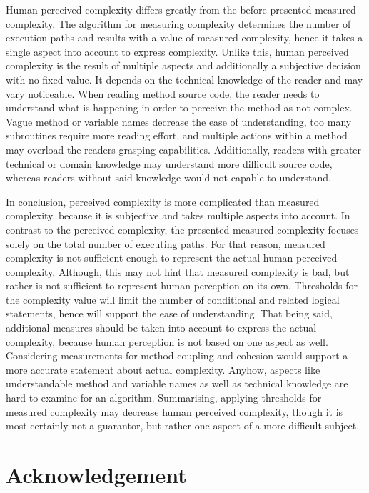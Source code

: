 \documentclass[conference]{IEEEtran}
\begin{document}
Human perceived complexity differs greatly from the before presented measured complexity. The algorithm for measuring complexity determines the number of execution paths and results with a value of measured complexity, hence it takes a single aspect into account to express complexity. Unlike this, human perceived complexity is the result of multiple aspects and additionally a subjective decision with no fixed value. It depends on the technical knowledge of the reader and may vary noticeable. When reading method source code, the reader needs to understand what is happening in order to perceive the method as not complex. Vague method or variable names decrease the ease of understanding, too many subroutines require more reading effort, and multiple actions within a method may overload the readers grasping capabilities. Additionally, readers with greater technical or domain knowledge may understand more difficult source code, whereas readers without said knowledge would not capable to understand. 

In conclusion, perceived complexity is more complicated than measured complexity, because it is subjective and takes multiple aspects into account. In contrast to the perceived complexity, the presented measured complexity focuses solely on the total number of executing paths. For that reason, measured complexity is not sufficient enough to represent the actual human perceived complexity. Although, this may not hint that measured complexity is bad, but rather is not sufficient to represent human perception on its own. Thresholds for the complexity value will limit the number of conditional and related logical statements, hence will support the ease of understanding. That being said, additional measures should be taken into account to express the actual complexity, because human perception is not based on one aspect as well. Considering measurements for method coupling and cohesion would support a more accurate statement about actual complexity. Anyhow, aspects like understandable method and variable names as well as technical knowledge are hard to examine for an algorithm. Summarising, applying thresholds for measured complexity may decrease human perceived complexity, though it is most certainly not a guarantor, but rather one aspect of a more difficult subject.

\section{Acknowledgement}
\blindtext
\end{document}
